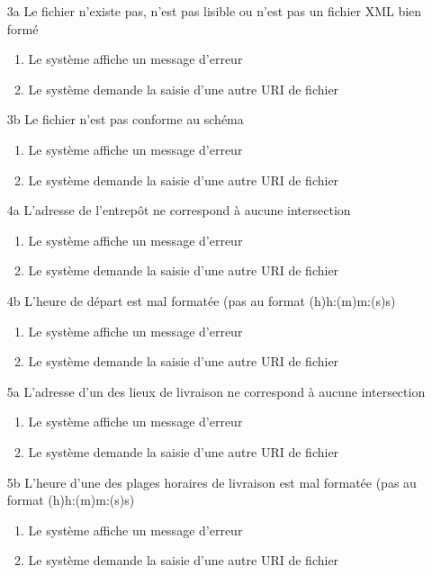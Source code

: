 \documentclass{article}
\begin{document}
\begin{itemize}
\item[3a] Le fichier n'existe pas, n'est pas lisible ou n'est pas un fichier XML bien formé
\begin{enumerate}
\item Le système affiche un message d'erreur
\item Le système demande la saisie d'une autre URI de fichier
\end{enumerate}

\item[3b] Le fichier n'est pas conforme au schéma
\begin{enumerate}
\item Le système affiche un message d'erreur
\item Le système demande la saisie d'une autre URI de fichier
\end{enumerate}

\item[4a] L'adresse de l'entrepôt ne correspond à aucune intersection
\begin{enumerate}
\item Le système affiche un message d'erreur
\item Le système demande la saisie d'une autre URI de fichier
\end{enumerate}

\item[4b] L'heure de départ est mal formatée (pas au format (h)h:(m)m:(s)s)
\begin{enumerate}
\item Le système affiche un message d'erreur
\item Le système demande la saisie d'une autre URI de fichier
\end{enumerate}

\item[5a] L'adresse d'un des lieux de livraison ne correspond à aucune intersection
\begin{enumerate}
\item Le système affiche un message d'erreur
\item Le système demande la saisie d'une autre URI de fichier
\end{enumerate}

\item[5b] L'heure d'une des plages horaires de livraison est mal formatée (pas au format (h)h:(m)m:(s)s)
\begin{enumerate}
\item Le système affiche un message d'erreur
\item Le système demande la saisie d'une autre URI de fichier
\end{enumerate}
\end{itemize}
\end{document}
